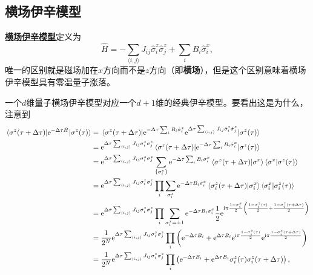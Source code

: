 \documentclass[hyperref, UTF8, a4paper]{ctexart}
\newcommand*{\ii}{\mathrm{i}}
\newcommand*{\ee}{\mathrm{e}}
\newcommand*{\pair}[1]{\langle #1 \rangle}
\renewcommand{\emph}[1]{\textbf{#1}}
\newcommand*{\concept}[1]{\underline{\textbf{#1}}}
\begin{document}
\subsection{横场伊辛模型}

\concept{横场伊辛模型}定义为
\begin{equation}
    \hat{H} = - \sum_{\pair{i, j}} J_{ij} \hat{\sigma}_i^z \hat{\sigma}_j^z + \sum_{i} B_i \hat{\sigma}_i^x,
\end{equation}
唯一的区别就是磁场加在$x$方向而不是$z$方向（即\emph{横场}），但是这个区别意味着横场伊辛模型具有零温量子涨落。

一个$d$维量子横场伊辛模型对应一个$d+1$维的经典伊辛模型。要看出这是为什么，注意到
\[
    \begin{aligned}
        \mel{\sigma^z(\tau + \Delta \tau)}{\ee^{-\Delta \tau \hat{H}}}{\sigma^z(\tau)} &= \mel{\sigma^z(\tau + \Delta \tau)}{\ee^{-\Delta \tau \sum_i B_i \hat{\sigma}^x_i} \ee^{\Delta \tau \sum_{\pair{i, j}} J_{ij} \hat{\sigma}_i^z \hat{\sigma}_j^z}}{\sigma^z(\tau)} \\
        &= \ee^{\Delta \tau \sum_{\pair{i, j}} J_{ij} \sigma_i^z \sigma_j^z} \mel{\sigma^z(\tau + \Delta \tau)}{\ee^{-\Delta \tau \sum_i B_i \hat{\sigma}^x_i}}{\sigma^z(\tau)} \\
        &= \ee^{\Delta \tau \sum_{\pair{i, j}} J_{ij} \sigma_i^z \sigma_j^z} \sum_{\{\sigma^x_i\}} \ee^{-\Delta \tau \sum_i B_i \sigma^x_i} \braket{\sigma^z(\tau + \Delta \tau)}{\sigma^x} \braket{\sigma^x}{\sigma^z(\tau)} \\
        &= \ee^{\Delta \tau \sum_{\pair{i, j}} J_{ij} \sigma_i^z \sigma_j^z} \prod_{i} \sum_{\sigma^x_i} \ee^{-\Delta \tau B_i \sigma^x_i} \braket{\sigma^z_i(\tau + \Delta \tau)}{\sigma^x_i} \braket{\sigma^x_i}{\sigma^z_i(\tau)} \\
        &= \ee^{\Delta \tau \sum_{\pair{i, j}} J_{ij} \sigma_i^z \sigma_j^z} \prod_{i} \sum_{\sigma^x_i = \pm 1} \ee^{-\Delta \tau B_i \sigma^x_i} \frac{1}{2} \ee^{\ii \pi \frac{1 - \sigma^x_i}{2} \left( \frac{1 - \sigma^z_i(\tau)}{2} + \frac{1 - \sigma^z_i(\tau + \Delta \tau)}{2} \right)} \\
        &= \frac{1}{2^N} \ee^{\Delta \tau \sum_{\pair{i, j}} J_{ij} \sigma_i^z \sigma_j^z} \prod_i \left( \ee^{- \Delta \tau B_i} + \ee^{\Delta \tau B_i} \ee^{\ii \pi \frac{1 - \sigma^z_i(\tau)}{2}} \ee^{\ii \pi \frac{1 - \sigma^z_i(\tau + \Delta \tau)}{2}} \right) \\
        &= \frac{1}{2^N} \ee^{\Delta \tau \sum_{\pair{i, j}} J_{ij} \sigma_i^z \sigma_j^z} \prod_i \left( \ee^{- \Delta \tau B_i} + \ee^{\Delta \tau B_i} \sigma^z_i(\tau) \sigma^z_i(\tau + \Delta \tau) \right),
    \end{aligned}
\]
\end{document}
